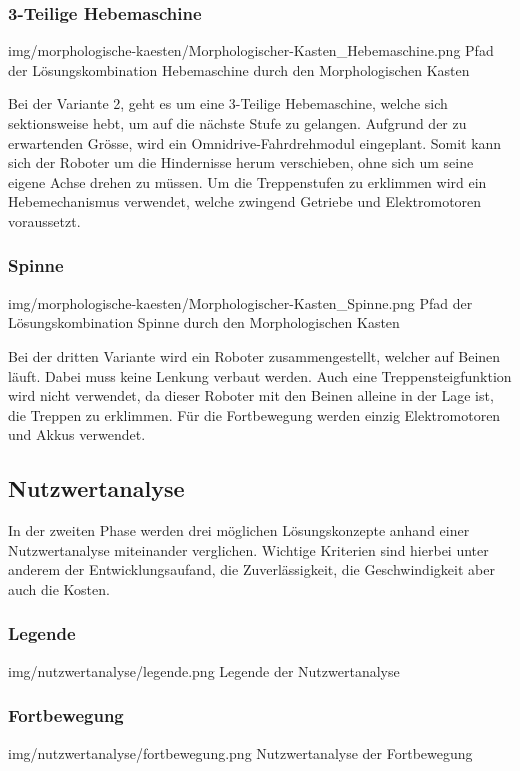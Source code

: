 \subsubsection{3-Teilige Hebemaschine}
\image
   {img/morphologische-kaesten/Morphologischer-Kasten_Hebemaschine.png}
   {Pfad der Lösungskombination Hebemaschine durch den Morphologischen Kasten}
   
Bei der Variante 2, geht es um eine 3-Teilige Hebemaschine, welche sich sektionsweise hebt, um auf die nächste Stufe zu gelangen. Aufgrund der zu erwartenden Grösse, wird ein Omnidrive-Fahrdrehmodul eingeplant. Somit kann sich der Roboter um die Hindernisse herum verschieben, ohne sich um seine eigene Achse drehen zu müssen. Um die Treppenstufen zu erklimmen wird ein Hebemechanismus verwendet, welche zwingend Getriebe und Elektromotoren voraussetzt.

\subsubsection{Spinne}
\image
   {img/morphologische-kaesten/Morphologischer-Kasten_Spinne.png}
   {Pfad der Lösungskombination Spinne durch den Morphologischen Kasten}
   
Bei der dritten Variante wird ein Roboter zusammengestellt, welcher auf Beinen läuft. Dabei muss keine Lenkung verbaut werden. Auch eine Treppensteigfunktion wird nicht verwendet, da dieser Roboter mit den Beinen alleine in der Lage ist, die Treppen zu erklimmen. Für die Fortbewegung werden einzig Elektromotoren und Akkus verwendet.


\subsection{Nutzwertanalyse}
In der zweiten Phase werden drei möglichen Lösungskonzepte anhand einer Nutzwertanalyse miteinander verglichen. Wichtige Kriterien sind hierbei unter anderem der Entwicklungsaufand, die Zuverlässigkeit, die Geschwindigkeit aber auch die Kosten. 

\subsubsection{Legende}
\image
   {img/nutzwertanalyse/legende.png}
   {Legende der Nutzwertanalyse}

\subsubsection{Fortbewegung}
\image
   {img/nutzwertanalyse/fortbewegung.png}
   {Nutzwertanalyse der Fortbewegung}
   
